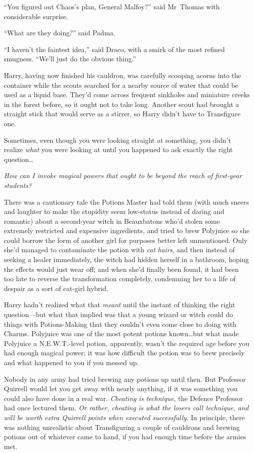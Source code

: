 “You figured out Chaos’s plan, General Malfoy?” said Mr~Thomas with considerable surprise.

“What are they doing?” said Padma.

“I haven’t the faintest idea,” said Draco, with a smirk of the most refined smugness. “We’ll just do the obvious thing.”

\later

Harry, having now finished his cauldron, was carefully scooping acorns into the container while the scouts searched for a nearby source of water that could be used as a liquid base. They’d come across frequent sinkholes and miniature creeks in the forest before, so it ought not to take long. Another scout had brought a straight stick that would serve as a stirrer, so Harry didn’t have to Transfigure one.

Sometimes, even though you were looking straight at something, you didn’t realize \emph{what} you were looking at until you happened to ask exactly the right question…

\emph{How can I invoke magical powers that ought to be beyond the reach of first-year students?}

There was a cautionary tale the Potions Master had told them (with much sneers and laughter to make the stupidity seem low-status instead of daring and romantic) about a second-year witch in Beauxbatons who’d stolen some extremely restricted and expensive ingredients, and tried to brew Polyjuice so she could borrow the form of another girl for purposes better left unmentioned. Only she’d managed to contaminate the potion with \emph{cat hairs}, and then instead of seeking a healer immediately, the witch had hidden herself in a bathroom, hoping the effects would just wear off; and when she’d finally been found, it had been too late to reverse the transformation completely, condemning her to a life of despair as a sort of cat-girl hybrid.

Harry hadn’t realized what that \emph{meant} until the instant of thinking the right question—but what that implied was that a young wizard or witch could do things with Potions-Making that they couldn’t even come close to doing with Charms. Polyjuice was one of the most potent potions known…but what made Polyjuice a N.E.W.T.-level potion, apparently, wasn’t the required age before you had enough magical power; it was how difficult the potion was to brew precisely and what happened to you if you messed up.

Nobody in any army had tried brewing any potions up until then. But Professor Quirrell would let you get away with nearly anything, if it was something you could also have done in a real war. \emph{Cheating is technique,} the Defence Professor had once lectured them. \emph{Or rather, cheating is what the losers call technique, and will be worth extra Quirrell points when executed successfully.} In principle, there was nothing unrealistic about Transfiguring a couple of cauldrons and brewing potions out of whatever came to hand, if you had enough time before the armies met.

